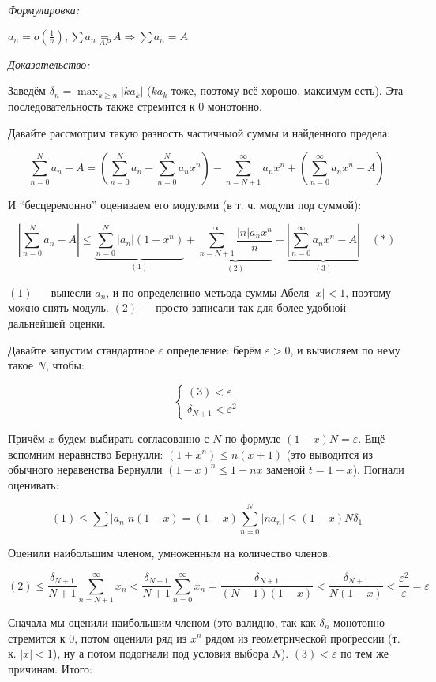 \documentclass{article}
\def\eqby#1{\underset{#1}{=}}
\begin{document}
\textit{Формулировка:}

$a_n = o(\frac{1}{n}), \sum a_n \eqby{AP} A \Rightarrow \sum a_n = A$

\textit{Доказательство:}

Заведём $\delta_n = \max_{k \ge n} |ka_k|$ ($ka_k$ тоже, поэтому всё хорошо, максимум есть). Эта последовательность также стремится к 0 монотонно.

Давайте рассмотрим такую разность частичныой суммы и найденного предела:

\[\sum_{n = 0}^{N} a_n - A = \left(\sum_{n = 0}^{N} a_n - \sum_{n = 0}^{N} a_n x^n\right) - \sum_{n = N + 1}^{\infty} a_n x^n + \left(\sum_{n = 0}^{\infty} a_n x^n - A\right)\]

И ``бесцеремонно'' оцениваем его модулями (в т. ч. модули под суммой): 

\[\left|\sum_{n = 0}^{N} a_n - A\right| \le \underbrace{\sum_{n = 0}^{N} |a_n|(1 - x^n)}_{(1)} + \underbrace{\sum_{n = N + 1}^{\infty} \frac{|n|a_n x^n}{n}}_{(2)} + \underbrace{\left|\sum_{n = 0}^{\infty} a_n x^n - A\right|}_{(3)} \quad (*)\]

$(1)$ --- вынесли $a_n$, и по определению метьода суммы Абеля $|x| < 1$, поэтому можно снять модуль. $(2)$ --- просто записали так для более удобной дальнейшей оценки. 

Давайте запустим стандартное $\varepsilon$ определение: берём $\varepsilon > 0$, и вычисляем по нему такое $N$, чтобы: 

\[\begin{cases}
    (3) < \varepsilon\\
    \delta_{N + 1} < \varepsilon^2
\end{cases}\]

Причём $x$ будем выбирать согласованно с $N$ по формуле $(1 - x)N = \varepsilon$. Ещё вспомним неравнство Бернулли: $(1 + x^n) \le n(x + 1)$ (это выводится из обычного неравенства Бернулли $(1 - x)^n \le 1 - nx$ заменой $t = 1 - x$). Погнали оценивать: 

\[(1) \le \sum |a_n|n(1 - x) = (1 - x)\sum_{n = 0}^{N}|na_n| \le (1 - x)N\delta_1\]

Оценили наибольшим членом, умноженным на количество членов.

\[(2) \le \frac{\delta_{N + 1}}{N + 1}\sum_{n = N + 1}^{\infty} x_n < \frac{\delta_{N + 1}}{N + 1}\sum_{n = 0}^{\infty} x_n = \frac{\delta_{N + 1}}{(N + 1)(1 - x)} < \frac{\delta_{N + 1}}{N(1 - x)} < \frac{\varepsilon^2}{\varepsilon}= \varepsilon\]

Сначала мы оценили наибольшим членом (это валидно, так как $\delta_n$ монотонно стремится к $0$, потом оценили ряд из $x^n$ рядом из геометрической прогрессии (т. к. $|x| < 1$), ну а потом подогнали под условия выбора $N$). $(3) < \varepsilon$ по тем же причинам. Итого: 
\end{document}
